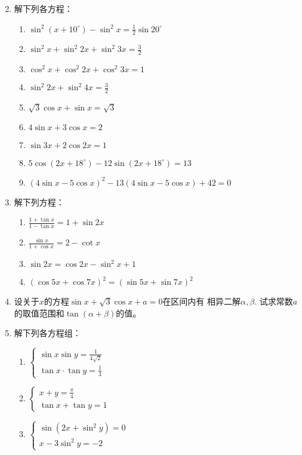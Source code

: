 \begin{enumerate}
\begin{multicols}{2}
\begin{enumerate}
\end{enumerate}
\end{multicols}

\item 解下列各方程：
    \begin{enumerate}
\item $\sin ^{2}\left(x+10^{\circ}\right)-\sin ^{2} x=\frac{1}{2} \sin 20^{\circ}$
\item $\sin ^{2} x+\sin ^{2} 2 x+\sin ^{2} 3 x=\frac{3}{2}$
\item $\cos ^{2} x+\cos ^{2} 2 x+\cos ^{2} 3 x=1$
\item $\sin ^{2} 2 x+\sin ^{2} 4 x=\frac{3}{2}$
\item $\sqrt{3} \cos x+\sin x=\sqrt{3} $
\item $4 \sin x+3 \cos x=2 $
\item $\sin 3 x+2 \cos 2 x=1 $
\item  $5 \cos \left(2 x+18^{\circ}\right)-12 \sin \left(2 x+18^{\circ}\right)=13$
\item $(4 \sin x-5 \cos x)^{2}-13(4 \sin x-5 \cos x)+42=0$
\end{enumerate}


\item 解下列方程：
    \begin{enumerate}
\item $\frac{1+\tan x}{1-\tan x}=1+\sin 2 x$
\item $\frac{\sin x}{1+\cos x}=2-\cot x$
\item $\sin 2 x=\cos 2 x-\sin ^{2} x+1$
\item $(\cos 5 x+\cos 7 x)^{2}=(\sin 5 x+\sin 7 x)^{2}$
\end{enumerate}

\item 设关于$x$的方程$\sin x+\sqrt{3}\cos x+a=0$在区间内有
相异二解$\alpha,\beta$. 试求常数$a$的取值范围和$\tan(\alpha+\beta)$的值。
\item 解下列各方程组：
\begin{multicols}{2}
    \begin{enumerate}
\item $\begin{cases}
    \sin x\sin y=\frac{1}{4\sqrt{2}}\\
    \tan x\cdot \tan y=\frac{1}{3}
\end{cases}$
\item $\begin{cases}
    x+y=\frac{\pi}{4}\\
    \tan x+\tan y=1
\end{cases}$
\item $\begin{cases}
    \sin(2x+\sin^2y)=0\\
    x-3\sin^2y=-2
\end{cases}$
\end{enumerate}
\end{multicols}


\end{enumerate}
